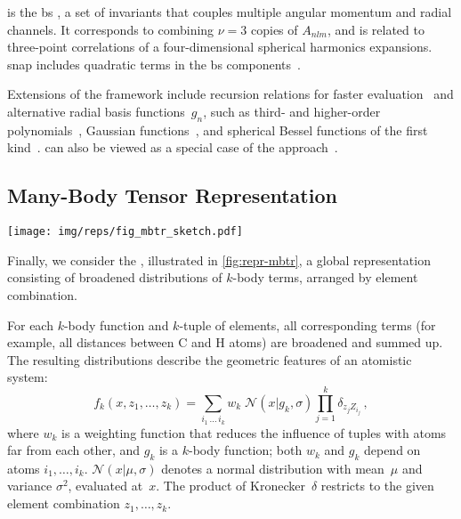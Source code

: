  is the \gls{bs} \cite{bpkc2010q}, a set of invariants that couples multiple angular momentum and radial channels. It corresponds to combining $\nu = 3$ copies of $A_{nlm}$, and is related to three-point correlations of a four-dimensional spherical harmonics expansions.
\Gls{snap} includes quadratic terms in the \gls{bs} components~\cite{wt2018q}.

Extensions of the \soap framework include recursion relations for faster evaluation~\cite{c2019Bq} and alternative radial basis functions~$g_n$, such as third- and higher-order polynomials~\cite{c2019Bq}, Gaussian functions~\cite{hjrf2020q}, and spherical Bessel functions of the first kind~\cite{kme2019q,kme2020q}. \soap can also be viewed as a special case of the \ace approach~\cite{d2019q,dboo2022q}.

\subsection{Many-Body Tensor Representation}

\begin{figure*}
  \centering
  \texttt{[image: img/reps/fig\_mbtr\_sketch.pdf]}
  \caption{
  	Illustration of the \gls{mbtr}.
    Shown is a broadened histogram of distances (no weighting) arranged by element combination.
  }
  \label{fig:repr-mbtr}
\end{figure*}
\noindent
Finally, we consider the \mbtr, illustrated in \cref{fig:repr-mbtr}, a global representation consisting of broadened distributions of $k$-body terms, arranged by element combination. 

For each $k$-body function and $k$-tuple of elements, all corresponding terms (for example, all distances between C and H atoms) are broadened and summed up.
The resulting distributions describe the geometric features of an atomistic system:
%
\begin{equation}
	\label{equ:mbtr}
	f_k(x, z_1, \ldots, z_k) = \sum_{i_1\, \ldots\, i_k} w_k \; \mathcal{N}(x|g_k,\sigma) \prod_{j=1}^k \delta_{z_j Z_{i_j}} \,, %
\end{equation}
%
where $w_k$ is a weighting function that reduces the influence of tuples with atoms far from each other, and $g_k$ is a $k$-body function; both $w_k$ and $g_k$ depend on atoms $i_1, \ldots, i_k$.
$\mathcal{N}(x|\mu,\sigma)$ denotes a normal distribution with mean~$\mu$ and variance $\sigma^2$, evaluated at~$x$.
The product of Kronecker~$\delta$ restricts to the given element combination $z_1,\ldots,z_k$.

